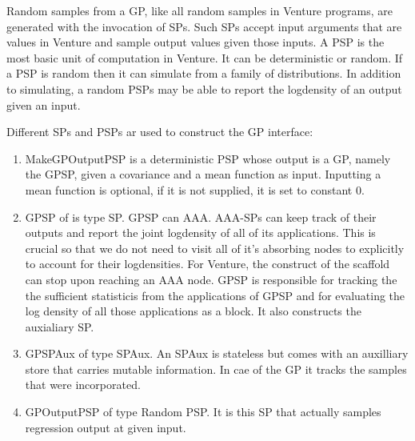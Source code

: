 Random samples from a \ac{GP}, like all random samples in Venture programs,
are generated with the invocation of \ac{SP}s.
Such \ac{SP}s accept input arguments that are values in Venture and sample output
values given those inputs. A \ac{PSP} is the most basic unit of computation in
Venture. It can be deterministic or random. If a \ac{PSP} is random then it can simulate from a family of
distributions. In addition to simulating,
a random PSPs may be able to report the logdensity of an output given an input.

Different \ac{SP}s and \ac{PSP}s ar used to construct the \ac{GP} interface:
\begin{enumerate}
\item MakeGPOutputPSP is a deterministic PSP whose output is a \ac{GP}, namely the
GPSP, given a
covariance and a mean function as input. Inputting a mean function is optional,
if it is not supplied, it is set to constant 0.

\item GPSP of is type SP. GPSP can \ac{AAA}. \ac{AAA}-\ac{SP}s can keep track of
their outputs and report
the joint logdensity of all of its applications. This is crucial so that we do
not need to visit all of it's absorbing nodes to explicitly to account for their
logdensities. For Venture, the construct of the scaffold can stop upon
reaching an \ac{AAA} node. GPSP is responsible for tracking the the sufficient statisticis
from the applications of GPSP and for evaluating the log density of all those
applications as a block. It also constructs the auxialiary SP.
\item GPSPAux of type SPAux. An SPAux is stateless but comes with an auxilliary
store that carries mutable information. In cae of the \ac{GP} it tracks the
samples that were incorporated.
\item GPOutputPSP of type Random PSP.  It is this SP that actually samples
regression output at given input.
\end{enumerate}





